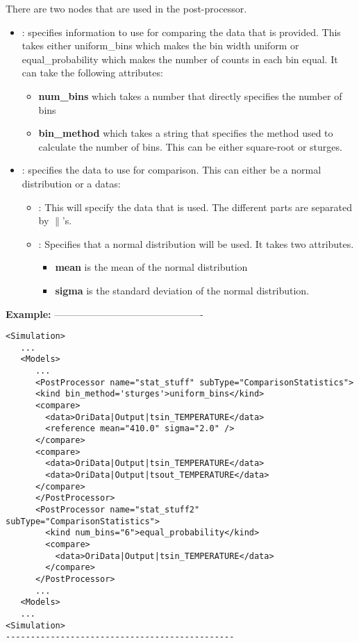 There are two nodes that are used in the post-processor.

\begin{itemize}
\item {}: specifies information to use for comparing the
  data that is provided.  This takes either uniform\_bins which makes
  the bin width uniform or equal\_probability which makes the number
  of counts in each bin equal.  It can take the following attributes:
  \begin{itemize}
  \item \textbf{num\_bins} which takes a number that directly
    specifies the number of bins
  \item \textbf{bin\_method} which takes a string that specifies the
    method used to calculate the number of bins.  This can be either
    square-root or sturges.
  \end{itemize}
\item {}: specifies the data to use for comparison.
  This can either be a normal distribution or a datas:
  \begin{itemize}
  \item {}: This will specify the data that is used.  The
    different parts are separated by $\|$'s.
  \item {}: Specifies that a normal distribution will
    be used. It takes two attributes.
    \begin{itemize}
    \item \textbf{mean} is the mean of the normal distribution
    \item \textbf{sigma} is the standard deviation of the normal
      distribution.
    \end{itemize}
  \end{itemize}
\end{itemize}

\textbf{Example:}
----------------------------------------------
\begin{lstlisting}[style=XML]
<Simulation>
   ...
   <Models>
      ...
      <PostProcessor name="stat_stuff" subType="ComparisonStatistics">
      <kind bin_method='sturges'>uniform_bins</kind>
      <compare>
        <data>OriData|Output|tsin_TEMPERATURE</data>
        <reference mean="410.0" sigma="2.0" />
      </compare>
      <compare>
        <data>OriData|Output|tsin_TEMPERATURE</data>
        <data>OriData|Output|tsout_TEMPERATURE</data>
      </compare>
      </PostProcessor>
      <PostProcessor name="stat_stuff2" subType="ComparisonStatistics">
        <kind num_bins="6">equal_probability</kind>
        <compare>
          <data>OriData|Output|tsin_TEMPERATURE</data>
        </compare>
      </PostProcessor>
      ...
   <Models>
   ...
<Simulation>
----------------------------------------------
\end{lstlisting}

